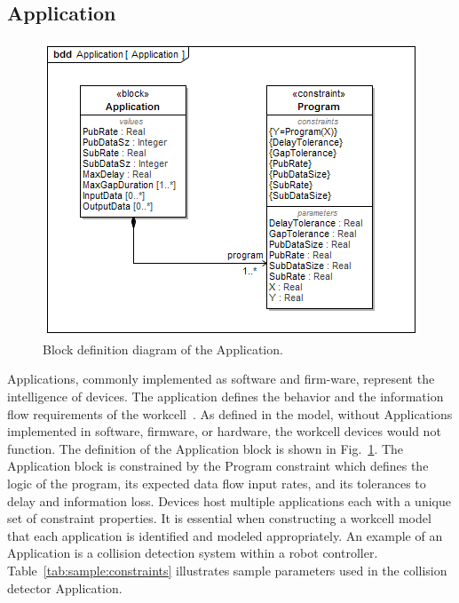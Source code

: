 \subsection{Application}\label{sysml:sec:application}

\begin{figure}[tbp]
	\centering
	\includegraphics[width=0.8\columnwidth]{./chapter-sysml/diagrams/bdd__Application__Application}
	\caption{Block definition diagram of the Application.}
	\label{sysml:fig:application:bdd}
\end{figure}

Applications, commonly implemented as software and firm-ware, represent the intelligence of devices. The application defines the behavior and the information flow requirements of the workcell~\cite{appWorkcell1996, appWorkcell2001, appWorkcell2011}.  As defined in the model, without Applications implemented in software, firmware, or hardware, the workcell devices would not function.  The definition of the Application block is shown in Fig.~\ref{sysml:fig:application:bdd}.  The Application block is constrained by the Program constraint which defines the logic of the program, its expected data flow input rates, and its tolerances to delay and information loss.  Devices host multiple applications each with a unique set of constraint properties.  It is essential when constructing a workcell model that each application is identified and modeled appropriately.  An example of an Application is a collision detection system within a robot controller. Table~\ref{tab:sample:constraints} illustrates sample parameters used in the collision detector Application.

